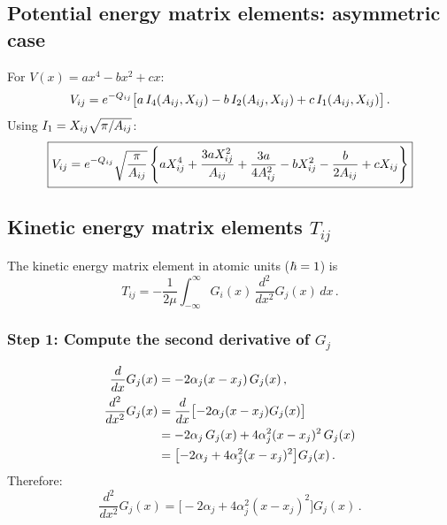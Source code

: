 \subsection{Potential energy matrix elements: asymmetric case}\label{sec:Gauss_V_asym}

For $V(x) = ax^4 - bx^2 + cx$:
\begin{equation}\label{eq:Vij_asym}
  V_{ij} = e^{-Q_{ij}}\bigl[a\,I_4(A_{ij},X_{ij}) - b\,I_2(A_{ij},X_{ij}) + c\,I_1(A_{ij},X_{ij})\bigr]\,.
\end{equation}
Using $I_1 = X_{ij}\sqrt{\pi/A_{ij}}$:
\begin{equation}
  \boxed{V_{ij} = e^{-Q_{ij}}\sqrt{\frac{\pi}{A_{ij}}}\left\{
    aX_{ij}^4 + \frac{3aX_{ij}^2}{A_{ij}} + \frac{3a}{4A_{ij}^2}
    - bX_{ij}^2 - \frac{b}{2A_{ij}}
    + cX_{ij}
  \right\}}
\end{equation}

\subsection{Kinetic energy matrix elements $T_{ij}$}\label{sec:Gauss_kinetic}

The kinetic energy matrix element in atomic units ($\hbar = 1$) is
\begin{equation}
  T_{ij} = -\frac{1}{2\mu}\int_{-\infty}^{\infty}G_i(x)\,\frac{d^2}{dx^2}G_j(x)\,dx\,.
\end{equation}

\subsubsection{Step 1: Compute the second derivative of $G_j$}

\begin{align}
  \frac{d}{dx}G_j(x) &= -2\alpha_j(x-x_j)\,G_j(x)\,,\\
  \frac{d^2}{dx^2}G_j(x) &= \frac{d}{dx}\bigl[-2\alpha_j(x-x_j)G_j(x)\bigr]\notag\\
  &= -2\alpha_j\,G_j(x) + 4\alpha_j^2(x-x_j)^2\,G_j(x)\notag\\
  &= \bigl[-2\alpha_j + 4\alpha_j^2(x-x_j)^2\bigr]G_j(x)\,.
\end{align}
Therefore:
\begin{equation}\label{eq:d2Gj}
  \frac{d^2}{dx^2}G_j(x) = \bigl[-2\alpha_j + 4\alpha_j^2(x-x_j)^2\bigr]G_j(x)\,.
\end{equation}

